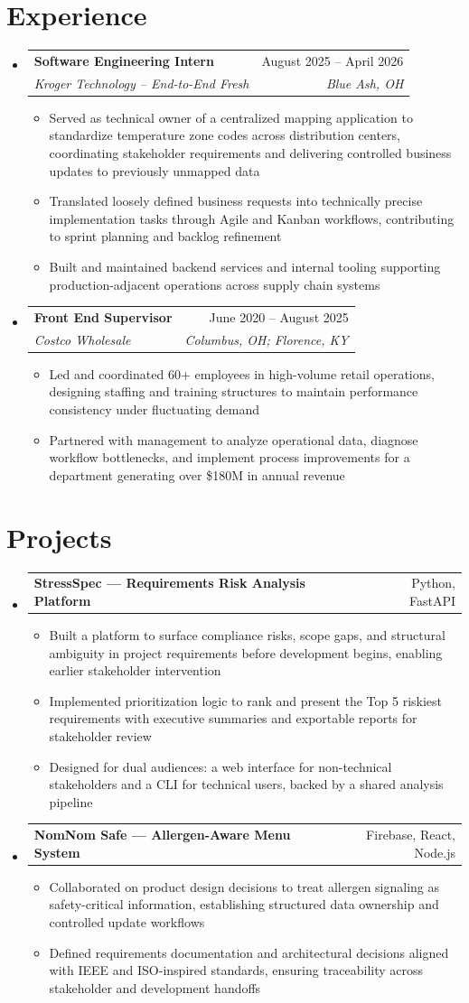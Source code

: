 \documentclass[letterpaper,11pt]{article}
\makeatletter
\newcommand{\resumeItem}[1]{
  \item\small{{#1 \vspace{-2pt}}}
}
\newcommand{\resumeSubheading}[4]{
  \vspace{-2pt}\item
    \begin{tabular*}{0.97\textwidth}[t]{l@{\extracolsep{\fill}}r}
      \textbf{#1} & #2 \\
      \textit{\small#3} & \textit{\small #4} \\
    \end{tabular*}\vspace{-7pt}
}
\newcommand{\resumeProjectHeading}[2]{
    \item
    \begin{tabular*}{0.97\textwidth}{l@{\extracolsep{\fill}}r}
      \small#1 & #2 \\
    \end{tabular*}\vspace{-7pt}
}
\newcommand{\resumeSubHeadingListStart}{\begin{itemize}[leftmargin=0.15in, label={}]}
\newcommand{\resumeSubHeadingListEnd}{\end{itemize}}
\newcommand{\resumeItemListStart}{\begin{itemize}}
\newcommand{\resumeItemListEnd}{\end{itemize}\vspace{-5pt}}
\makeatother
\begin{document}
\section{Experience}
\resumeSubHeadingListStart

\resumeSubheading
{Software Engineering Intern}{August 2025 -- April 2026}
{Kroger Technology -- End-to-End Fresh}{Blue Ash, OH}
\resumeItemListStart
\resumeItem{Served as technical owner of a centralized mapping application to standardize temperature zone codes across distribution centers, coordinating stakeholder requirements and delivering controlled business updates to previously unmapped data}
\resumeItem{Translated loosely defined business requests into technically precise implementation tasks through Agile and Kanban workflows, contributing to sprint planning and backlog refinement}
\resumeItem{Built and maintained backend services and internal tooling supporting production-adjacent operations across supply chain systems}
\resumeItemListEnd

\resumeSubheading
{Front End Supervisor}{June 2020 -- August 2025}
{Costco Wholesale}{Columbus, OH; Florence, KY}
\resumeItemListStart
\resumeItem{Led and coordinated 60+ employees in high-volume retail operations, designing staffing and training structures to maintain performance consistency under fluctuating demand}
\resumeItem{Partnered with management to analyze operational data, diagnose workflow bottlenecks, and implement process improvements for a department generating over \$180M in annual revenue}
\resumeItemListEnd

\resumeSubHeadingListEnd

\section{Projects}
\resumeSubHeadingListStart

\resumeProjectHeading
{\textbf{StressSpec — Requirements Risk Analysis Platform}}{Python, FastAPI}
\resumeItemListStart
\resumeItem{Built a platform to surface compliance risks, scope gaps, and structural ambiguity in project requirements before development begins, enabling earlier stakeholder intervention}
\resumeItem{Implemented prioritization logic to rank and present the Top 5 riskiest requirements with executive summaries and exportable reports for stakeholder review}
\resumeItem{Designed for dual audiences: a web interface for non-technical stakeholders and a CLI for technical users, backed by a shared analysis pipeline}
\resumeItemListEnd

\resumeProjectHeading
{\textbf{NomNom Safe — Allergen-Aware Menu System}}{Firebase, React, Node.js}
\resumeItemListStart
\resumeItem{Collaborated on product design decisions to treat allergen signaling as safety-critical information, establishing structured data ownership and controlled update workflows}
\resumeItem{Defined requirements documentation and architectural decisions aligned with IEEE and ISO-inspired standards, ensuring traceability across stakeholder and development handoffs}
\resumeItemListEnd

\resumeSubHeadingListEnd
\end{document}
